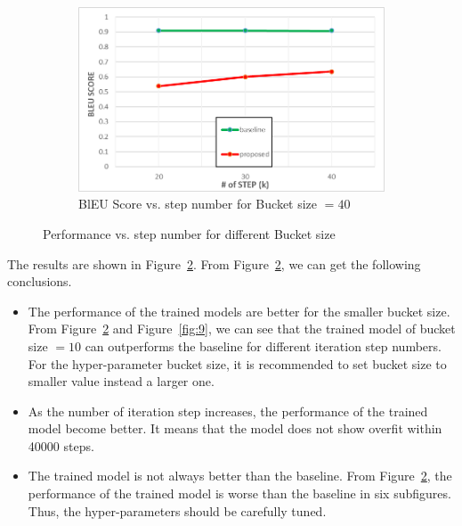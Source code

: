 \begin{figure}
\begin{subfigure}[b]{0.475\textwidth}
        \includegraphics[width=\textwidth]{BLUE40.png}
        \caption[]%
        {{\small BlEU Score vs. step number for Bucket size $= 40$}}    
        \label{fig:BLUE40}
    \end{subfigure}
    \caption[]
    {\small Performance vs. step number for different Bucket size} 
    \label{fig:performance}
\end{figure}
The results are shown in Figure~\ref{fig:performance}.
From Figure~\ref{fig:performance}, we can get the following conclusions.
\begin{itemize}
    \item The performance of the trained models are better for the smaller bucket size. From Figure~\ref{fig:performance} and Figure~\ref{fig:9}, we can see that the trained model of bucket size $=10$ can outperforms the baseline for different iteration step numbers. For the hyper-parameter bucket size, it is recommended to set bucket size to smaller value instead a larger one.
    \item As the number of iteration step increases, the performance of the trained model become better. It means that the model does not show overfit within 40000 steps.
    \item The trained model is not always better than the baseline. From Figure~\ref{fig:performance}, the performance of the trained model is worse than the baseline in six subfigures. Thus, the hyper-parameters should be carefully tuned.
\end{itemize}

